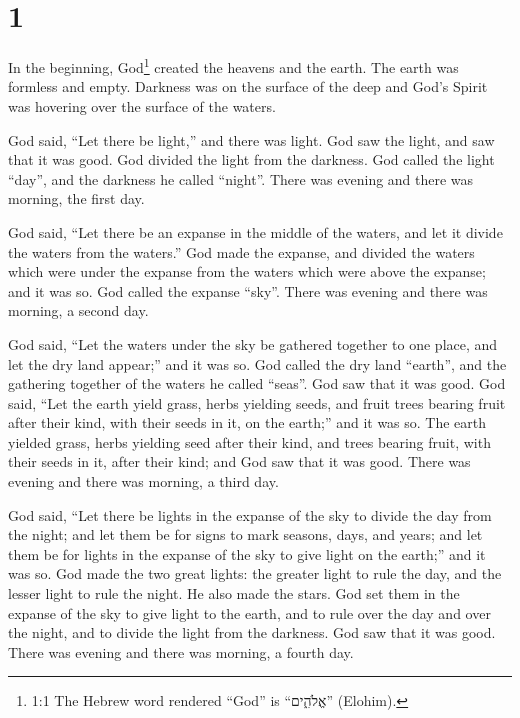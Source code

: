 \hypertarget{section}{%
\section{1}\label{section}}

 In the beginning, God\footnote{1:1 The Hebrew word rendered
  ``God'' is ``אֱלֹהִ֑ים'' (Elohim).} created the heavens and the earth.
 The earth was formless and empty. Darkness was on the
surface of the deep and God's Spirit was hovering over the surface of
the waters.

 God said, ``Let there be light,'' and there was light.
 God saw the light, and saw that it was good. God divided
the light from the darkness.  God called the light ``day'',
and the darkness he called ``night''. There was evening and there was
morning, the first day.

 God said, ``Let there be an expanse in the middle of the
waters, and let it divide the waters from the waters.''  God
made the expanse, and divided the waters which were under the expanse
from the waters which were above the expanse; and it was so.
 God called the expanse ``sky''. There was evening and there
was morning, a second day.

 God said, ``Let the waters under the sky be gathered
together to one place, and let the dry land appear;'' and it was so.
 God called the dry land ``earth'', and the gathering
together of the waters he called ``seas''. God saw that it was good.
 God said, ``Let the earth yield grass, herbs yielding
seeds, and fruit trees bearing fruit after their kind, with their seeds
in it, on the earth;'' and it was so.  The earth yielded
grass, herbs yielding seed after their kind, and trees bearing fruit,
with their seeds in it, after their kind; and God saw that it was good.
 There was evening and there was morning, a third day.

 God said, ``Let there be lights in the expanse of the sky
to divide the day from the night; and let them be for signs to mark
seasons, days, and years;  and let them be for lights in
the expanse of the sky to give light on the earth;'' and it was so.
 God made the two great lights: the greater light to rule
the day, and the lesser light to rule the night. He also made the stars.
 God set them in the expanse of the sky to give light to
the earth,  and to rule over the day and over the night,
and to divide the light from the darkness. God saw that it was good.
 There was evening and there was morning, a fourth day.

